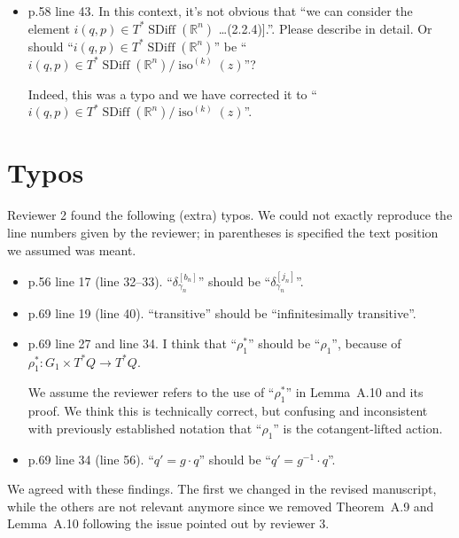 \documentclass{article}
\def\R{\mathbb{R} }
\def\R{\mathbb{R} }
\DeclareMathOperator{\SDiff}{SDiff}
\DeclareMathOperator{\iso}{iso}
\begin{document}
\begin{itemize}
\item p.58 line 43. In this context, it's not obvious that ``we can
  consider the element $i(q, p) \in T^*\SDiff(\R^n)$ \ldots (2.2.4)].''.
  Please describe in detail. Or should ``$i(q,p) \in T^*\SDiff(\R^n)$''
  be ``$i(q,p) \in T^*\SDiff(\R^n) / \iso^{(k)}(z)$''?

  Indeed, this was a typo and we have corrected it to
  ``$i(q,p) \in T^*\SDiff(\R^n) / \iso^{(k)}(z)$''.
\end{itemize}

\section{Typos}
Reviewer 2 found the following (extra) typos. We could not exactly
reproduce the line numbers given by the reviewer; in parentheses is
specified the text position we assumed was meant.
\begin{itemize}
\item p.56 line 17 (line 32--33). ``$\delta_{\gamma_n}^{[b_n]}$'' should be ``$\delta_{\gamma_n}^{[j_n]}$''.
\item p.69 line 19 (line 40). ``transitive'' should be ``infinitesimally transitive''.
\item p.69 line 27 and line 34. I think that ``$\rho_1^*$'' should be
  ``$\rho_1$'', because of $\rho_1^*: G_1 \times T^*Q \to T^*Q$.

  We assume the reviewer refers to the use of ``$\rho_1^*$'' in
  Lemma~A.10 and its proof. We think this is technically correct, but
  confusing and inconsistent with previously established notation that
  ``$\rho_1$'' is the cotangent-lifted action.
\item p.69 line 34 (line 56). ``$q' = g \cdot q$'' should be ``$q' = g^{-1} \cdot q$''.
\end{itemize}

\noindent
We agreed with these findings. The first we changed in the revised
manuscript, while the others are not relevant anymore since we removed
Theorem~A.9 and Lemma~A.10 following the issue pointed out by reviewer 3.
\end{document}
